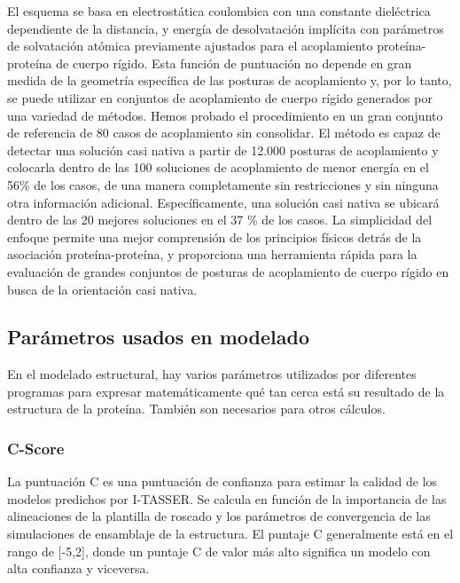 \documentclass[11pt, letterpaper, spanish]{article}
\begin{document}
{{    \par{El esquema se basa en electrostática coulombica con una constante dieléctrica dependiente de la distancia, y energía de desolvatación implícita con parámetros de solvatación atómica previamente ajustados para el acoplamiento proteína-proteína de cuerpo rígido. Esta función de puntuación no depende en gran medida de la geometría específica de las posturas de acoplamiento y, por lo tanto, se puede utilizar en conjuntos de acoplamiento de cuerpo rígido generados por una variedad de métodos. Hemos probado el procedimiento en un gran conjunto de referencia de 80 casos de acoplamiento sin consolidar. El método es capaz de detectar una solución casi nativa a partir de 12.000 posturas de acoplamiento y colocarla dentro de las 100 soluciones de acoplamiento de menor energía en el 56\% de los casos, de una manera completamente sin restricciones y sin ninguna otra información adicional. Específicamente, una solución casi nativa se ubicará dentro de las 20 mejores soluciones en el 37 \% de los casos. La simplicidad del enfoque permite una mejor comprensión de los principios físicos detrás de la asociación proteína-proteína, y proporciona una herramienta rápida para la evaluación de grandes conjuntos de posturas de acoplamiento de cuerpo rígido en busca de la orientación casi nativa.}

\subsection{Parámetros usados en modelado}
\par{En el modelado estructural, hay varios parámetros utilizados por diferentes programas para expresar matemáticamente qué tan cerca está su resultado de la estructura de la proteína. También son necesarios para otros cálculos.
\subsubsection{C-Score}
\par{La puntuación C es una puntuación de confianza para estimar la calidad de los modelos predichos por I-TASSER. Se calcula en función de la importancia de las alineaciones de la plantilla de roscado y los parámetros de convergencia de las simulaciones de ensamblaje de la estructura. El puntaje C generalmente está en el rango de [-5,2], donde un puntaje C de valor más alto significa un modelo con alta confianza y viceversa.}
}}}
\end{document}
